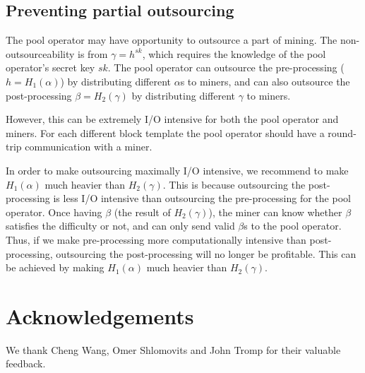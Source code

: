 \documentclass[a0,portrait]{a0poster}
\begin{document}
\begin{multicols}{2}
\subsection{Preventing partial outsourcing}

The pool operator may have opportunity to outsource a part of mining.
The non-outsourceability is from $\gamma = h^{sk}$, which requires the knowledge of the pool operator's secret key $sk$.
The pool operator can outsource the pre-processing ($h = H_1(\alpha)$) by distributing different $\alpha$s to miners, and can also outsource the post-processing $\beta = H_2(\gamma)$ by distributing different $\gamma$ to miners.

However, this can be extremely I/O intensive for both the pool operator and miners.
For each different block template the pool operator should have a round-trip communication with a miner.

In order to make outsourcing maximally I/O intensive, we recommend to make $H_1(\alpha)$ much heavier than $H_2(\gamma)$. 
This is because outsourcing the post-processing is less I/O intensive than outsourcing the pre-processing for the pool operator.
Once having $\beta$ (the result of $H_2(\gamma)$), the miner can know whether $\beta$ satisfies the difficulty or not, and can only send valid $\beta$s to the pool operator.
Thus, if we make pre-processing more computationally intensive than post-processing, outsourcing the post-processing will no longer be profitable.
This can be achieved by making $H_1(\alpha)$ much heavier than $H_2(\gamma)$.




\section*{Acknowledgements}

We thank Cheng Wang, Omer Shlomovits and John Tromp for their valuable feedback.


\end{multicols}
\end{document}
